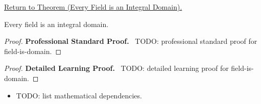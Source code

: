 \newpage
{}
\label{prf:field-is-domain}

\begin{remark*}[Return]
\hyperref[prop:field-is-domain]{Return to Theorem (Every Field is an Integral Domain).}
\end{remark*}

\begin{theorem*}
Every field is an integral domain.
\end{theorem*}

\begin{proof}
\textbf{Professional Standard Proof.}~
TODO: professional standard proof for field-is-domain.
\end{proof}

\begin{proof}
\textbf{Detailed Learning Proof.}~
TODO: detailed learning proof for field-is-domain.
\end{proof}

\begin{remark*}
\end{remark*}

\begin{dependencies}
\begin{itemize}
  \item TODO: list mathematical dependencies.
\end{itemize}
\end{dependencies}

\clearpage
